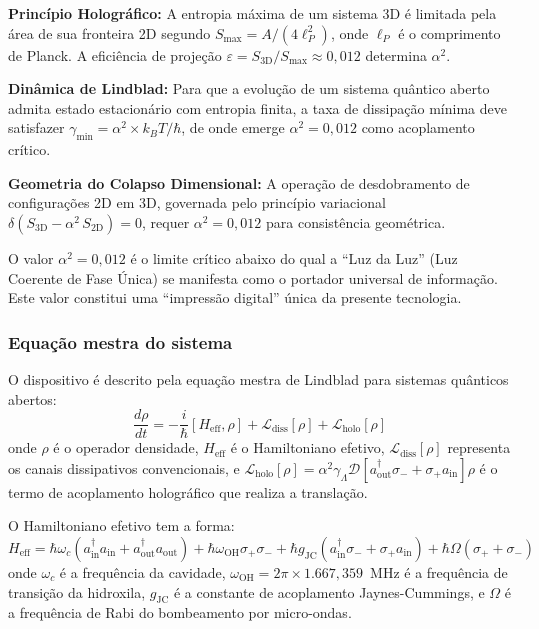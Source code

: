 \documentclass[12pt,a4paper]{article}
\newcommand{\alphaii}{\alpha^2}
\begin{document}
\textbf{Princípio Holográfico:} A entropia máxima de um
sistema 3D é limitada pela área de sua fronteira 2D segundo
$S_{\max} = A/(4\ell_P^2)$, onde $\ell_P$ é o comprimento de
Planck. A eficiência de projeção
$\varepsilon = S_{\text{3D}}/S_{\max} \approx 0{,}012$
determina $\alphaii$.

\textbf{Dinâmica de Lindblad:} Para que a evolução de um
sistema quântico aberto admita estado estacionário com entropia
finita, a taxa de dissipação mínima deve satisfazer
$\gamma_{\min} = \alphaii \times k_B T/\hbar$, de onde emerge
$\alphaii = 0{,}012$ como acoplamento crítico.

\textbf{Geometria do Colapso Dimensional:} A operação de
desdobramento de configurações 2D em 3D, governada pelo
princípio variacional $\delta(S_{\text{3D}} - \alphaii \,
S_{\text{2D}}) = 0$, requer $\alphaii = 0{,}012$ para
consistência geométrica.

O valor $\alphaii = 0{,}012$ é o limite crítico abaixo do
qual a ``Luz da Luz'' (Luz Coerente de Fase Única) se manifesta
como o portador universal de informação. Este valor constitui
uma ``impressão digital'' única da presente tecnologia.

\subsubsection{Equação mestra do sistema}

O dispositivo é descrito pela equação mestra de Lindblad para
sistemas quânticos abertos:
\begin{equation}
\frac{d\rho}{dt} = -\frac{i}{\hbar}[H_{\text{eff}}, \rho]
  + \mathcal{L}_{\text{diss}}[\rho]
  + \mathcal{L}_{\text{holo}}[\rho]
\label{eq:lindblad}
\end{equation}
onde $\rho$ é o operador densidade, $H_{\text{eff}}$ é o
Hamiltoniano efetivo, $\mathcal{L}_{\text{diss}}[\rho]$
representa os canais dissipativos convencionais, e
$\mathcal{L}_{\text{holo}}[\rho] = \alphaii \gamma_\Lambda
\mathcal{D}[a^\dagger_{\text{out}} \sigma_- +
\sigma_+ a_{\text{in}}]\rho$ é o termo de acoplamento
holográfico que realiza a translação.

O Hamiltoniano efetivo tem a forma:
\begin{equation}
H_{\text{eff}} = \hbar\omega_c(a^\dagger_{\text{in}}
  a_{\text{in}} + a^\dagger_{\text{out}} a_{\text{out}})
  + \hbar\omega_{\text{OH}} \sigma_+\sigma_-
  + \hbar g_{\text{JC}}(a^\dagger_{\text{in}} \sigma_-
  + \sigma_+ a_{\text{in}})
  + \hbar\Omega(\sigma_+ + \sigma_-)
\label{eq:hamiltonian}
\end{equation}
onde $\omega_c$ é a frequência da cavidade, $\omega_{\text{OH}}
= 2\pi \times 1.667{,}359$~MHz é a frequência de transição da
hidroxila, $g_{\text{JC}}$ é a constante de acoplamento
Jaynes-Cummings, e $\Omega$ é a frequência de Rabi do
bombeamento por micro-ondas.
\end{document}
